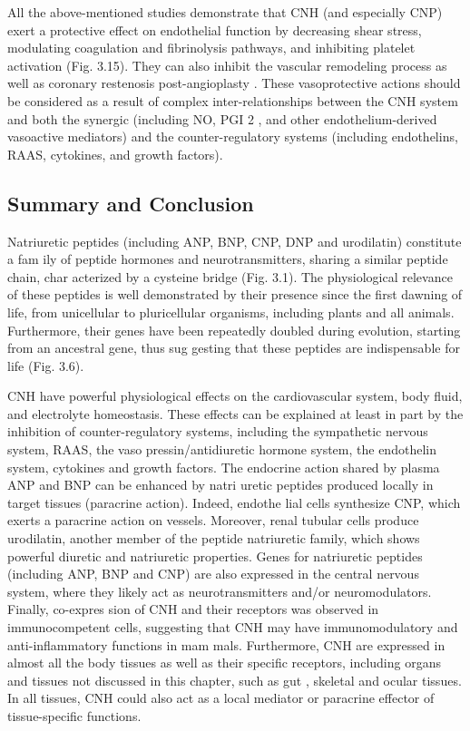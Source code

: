 \documentclass[14pt,a4paper,onecolumn]{extarticle}
\begin{document}
All the above-mentioned studies demonstrate that CNH (and especially CNP) exert a protective effect on endothelial function by decreasing shear stress, modulating coagulation and fibrinolysis pathways, and inhibiting platelet activation (Fig. 3.15). They can also inhibit the vascular remodeling process as well as coronary restenosis post-angioplasty \citep{56} \citep{84} \citep{85} \citep{86} \citep{87} \citep{88} \citep{89} \citep{267} \citep{281} \citep{283}. These vasoprotective actions should be considered as a result of complex inter-relationships between the CNH system and both the synergic (including NO, PGI 2 , and other endothelium-derived vasoactive mediators) and the counter-regulatory systems (including endothelins, RAAS, cytokines, and growth factors).

\subsection{Summary and Conclusion}

Natriuretic peptides (including ANP, BNP, CNP, DNP and urodilatin) constitute a fam ily of peptide hormones and neurotransmitters, sharing a similar peptide chain, char acterized by a cysteine bridge (Fig. 3.1). The physiological relevance of these peptides is well demonstrated by their presence since the first dawning of life, from unicellular to pluricellular organisms, including plants and all animals. Furthermore, their genes have been repeatedly doubled during evolution, starting from an ancestral gene, thus sug gesting that these peptides are indispensable for life (Fig. 3.6).

CNH have powerful physiological effects on the cardiovascular system, body fluid, and electrolyte homeostasis. These effects can be explained at least in part by the inhibition of counter-regulatory systems, including the sympathetic nervous system, RAAS, the vaso pressin/antidiuretic hormone system, the endothelin system, cytokines and growth factors.  The endocrine action shared by plasma ANP and BNP can be enhanced by natri uretic peptides produced locally in target tissues (paracrine action). Indeed, endothe lial cells synthesize CNP, which exerts a paracrine action on vessels. Moreover, renal tubular cells produce urodilatin, another member of the peptide natriuretic family, which shows powerful diuretic and natriuretic properties. Genes for natriuretic peptides (including ANP, BNP and CNP) are also expressed in the central nervous system, where they likely act as neurotransmitters and/or neuromodulators. Finally, co-expres sion of CNH and their receptors was observed in immunocompetent cells, suggesting that CNH may have immunomodulatory and anti-inflammatory functions in mam mals. Furthermore, CNH are expressed in almost all the body tissues as well as their specific receptors, including organs and tissues not discussed in this chapter, such as gut \citep{285}, skeletal \citep{106} and ocular \citep{286} tissues. In all tissues, CNH could also act as a local mediator or paracrine effector of tissue-specific functions.
\end{document}
